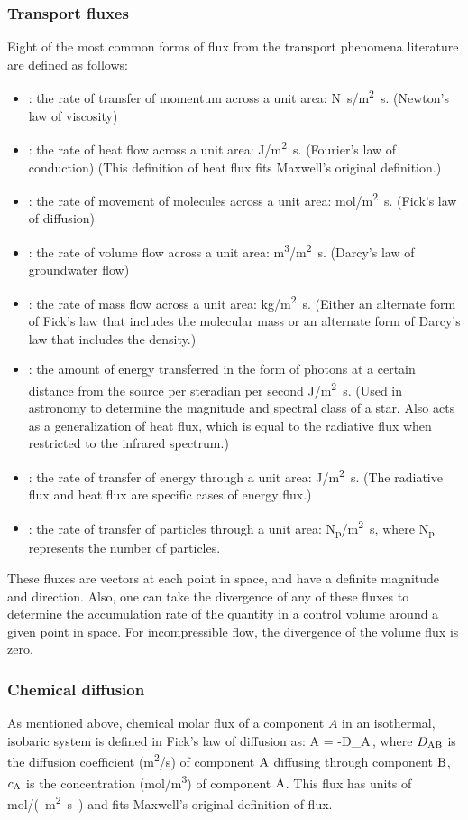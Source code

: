 \subsubsection{Transport fluxes}
Eight of the most common forms of flux from the transport phenomena literature are defined as follows:
\begin{itemize}
\item {}: the rate of transfer of momentum across a unit area: \si{N.s/m^2.s}. (Newton's law of viscosity)
%
\item {}: the rate of heat flow across a unit area: \si{J/m^2.s}. (Fourier's law of conduction) (This definition of heat flux fits Maxwell's original definition.)
%
\item {}: the rate of movement of molecules across a unit area: \si{mol/m^2.s}. (Fick's law of diffusion)
%
\item {}: the rate of volume flow across a unit area: \si{m^3/m^2.s}. (Darcy's law of groundwater flow)
%
\item {}: the rate of mass flow across a unit area: \si{kg/m^2.s}. (Either an alternate form of Fick's law that includes the molecular mass or an alternate form of Darcy's law that includes the density.)
%
\item {}: the amount of energy transferred in the form of photons at a certain distance from the source per steradian per second \si{J/m^2.s}. (Used in astronomy to determine the magnitude and spectral class of a star. Also acts as a generalization of heat flux, which is equal to the radiative flux when restricted to the infrared spectrum.)
%
\item {}: the rate of transfer of energy through a unit area: \si{J/m^2.s}. (The radiative flux and heat flux are specific cases of energy flux.)
%
\item {}: the rate of transfer of particles through a unit area: \si{N_p/m^2.s}, where \si{N_p} represents the number of particles.
%
\end{itemize}
These fluxes are vectors at each point in space, and have a definite magnitude and direction. Also, one can take the divergence of any of these fluxes to determine the accumulation rate of the quantity in a control volume around a given point in space. For incompressible flow, the divergence of the volume flux is zero.


\subsubsection{Chemical diffusion}
As mentioned above, chemical molar flux of a component $A$ in an isothermal, isobaric system is defined in Fick's law of diffusion as:
\beq
\mflux A = -D_{}\gder \conc A\,,
\eeq
where $D_{\ce{AB}}$ is the diffusion coefficient (\si{m^2/s}) of component $\ce A$ diffusing through component $\ce B$, $\conc A$ is the concentration (\si{mol/m^3}) of component $\ce A$. This flux has units of \si{mol/(m^2.s)} and fits Maxwell's original definition of flux.

